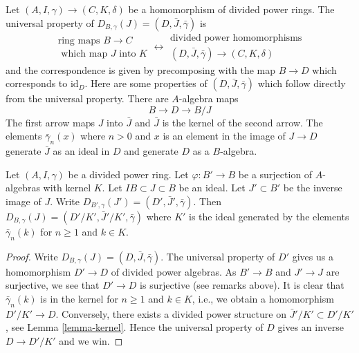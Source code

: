 \noindent
Let $(A, I, \gamma) \to (C, K, \delta)$ be a homomorphism of divided
power rings. The universal property of
$D_{B, \gamma}(J) = (D, \bar J, \bar \gamma)$ is
$$
\begin{matrix}
\text{ring maps }B \to C \\
\text{ which map }J\text{ into }K
\end{matrix}
\longleftrightarrow
\begin{matrix}
\text{divided power homomorphisms} \\
(D, \bar J, \bar \gamma) \to (C, K, \delta)
\end{matrix}
$$
and the correspondence is given by precomposing with the map $B \to D$
which corresponds to $\text{id}_D$. Here are some properties of
$(D, \bar J, \bar \gamma)$ which follow directly from the universal
property. There are $A$-algebra maps
\begin{equation}
\label{equation-divided-power-envelope}
B \longrightarrow D \longrightarrow B/J
\end{equation}
The first arrow maps $J$ into $\bar J$ and $\bar J$ is the kernel
of the second arrow. The elements $\bar\gamma_n(x)$ where $n > 0$
and $x$ is an element in the image of $J \to D$ generate $\bar J$
as an ideal in $D$ and generate $D$ as a $B$-algebra.

\begin{lemma}
\label{lemma-divided-power-envelop-quotient}
Let $(A, I, \gamma)$ be a divided power ring.
Let $\varphi : B' \to B$ be a surjection of $A$-algebras with kernel $K$.
Let $IB \subset J \subset B$ be an ideal. Let $J' \subset B'$
be the inverse image of $J$. Write
$D_{B', \gamma}(J') = (D', \bar J', \bar\gamma)$.
Then $D_{B, \gamma}(J) = (D'/K', \bar J'/K', \bar\gamma)$
where $K'$ is the ideal generated by the elements $\bar\gamma_n(k)$
for $n \geq 1$ and $k \in K$.
\end{lemma}

\begin{proof}
Write $D_{B, \gamma}(J) = (D, \bar J, \bar \gamma)$.
The universal property of $D'$ gives us a homomorphism $D' \to D$
of divided power algebras. As $B' \to B$ and $J' \to J$ are surjective, we
see that $D' \to D$ is surjective (see remarks above). It is clear that
$\bar\gamma_n(k)$ is in the kernel for $n \geq 1$ and $k \in K$, i.e.,
we obtain a homomorphism $D'/K' \to D$. Conversely, there exists a divided
power structure on $\bar J'/K' \subset D'/K'$, see
Lemma \ref{lemma-kernel}. Hence the universal property of $D$ gives an inverse
$D \to D'/K'$ and we win.
\end{proof}

